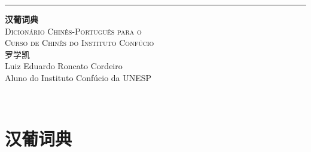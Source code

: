 \documentclass[a4paper,12pt,twoside,openany]{memoir}
\begin{document}
\begin{titlingpage}
	
	\raggedleft
	
	\rule{1pt}{\textheight}
	\hspace{0.05\textwidth}
	\parbox[b]{0.75\textwidth}{
		
		{\Huge\bfseries 汉葡词典}\\[2\baselineskip] %
		{\large\textsc{Dicionário Chinês-Português para o\\%
     			Curso de Chinês do Instituto Confúcio}}\\%
		[4\baselineskip]
    		{\Large\textsc{罗学凯}\\%
     		\tiny Luiz Eduardo Roncato Cordeiro\\%
 			Aluno do Instituto Confúcio da UNESP}
		
		\vspace{0.5\textheight}
		
		{\noindent \zhtoday}\\[\baselineskip]
	}

\end{titlingpage}

\tableofcontents

\newpage

\chapter{汉葡词典}

%
%
%

\clearpage
\begin{multicols}{2}























\end{multicols}
\end{document}
